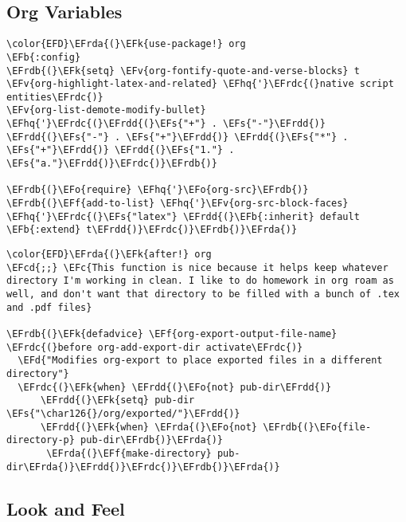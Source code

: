 \documentclass{article}
\newcommand{\EFc}[1]{\textcolor{EFc}{#1}} %
\newcommand{\EFcd}[1]{\textcolor{EFcd}{#1}} %
\newcommand{\EFs}[1]{\textcolor{EFs}{#1}} %
\newcommand{\EFd}[1]{\textcolor{EFd}{#1}} %
\newcommand{\EFk}[1]{\textcolor{EFk}{#1}} %
\newcommand{\EFb}[1]{\textcolor{EFb}{#1}} %
\newcommand{\EFf}[1]{\textcolor{EFf}{#1}} %
\newcommand{\EFv}[1]{\textcolor{EFv}{#1}} %
\newcommand{\EFo}[1]{\textcolor{EFo}{#1}} %
\newcommand{\EFhq}[1]{#1} %
\newcommand{\EFrda}[1]{\textcolor{EFrda}{#1}} %
\newcommand{\EFrdb}[1]{\textcolor{EFrdb}{#1}} %
\newcommand{\EFrdc}[1]{\textcolor{EFrdc}{#1}} %
\newcommand{\EFrdd}[1]{\textcolor{EFrdd}{#1}} %
\begin{document}
\subsection{Org Variables}
\label{sec:org506cd54}
\begin{Code}
\begin{Verbatim}
\color{EFD}\EFrda{(}\EFk{use-package!} org
\EFb{:config}
\EFrdb{(}\EFk{setq} \EFv{org-fontify-quote-and-verse-blocks} t
\EFv{org-highlight-latex-and-related} \EFhq{'}\EFrdc{(}native script entities\EFrdc{)}
\EFv{org-list-demote-modify-bullet} \EFhq{'}\EFrdc{(}\EFrdd{(}\EFs{"+"} . \EFs{"-"}\EFrdd{)} \EFrdd{(}\EFs{"-"} . \EFs{"+"}\EFrdd{)} \EFrdd{(}\EFs{"*"} . \EFs{"+"}\EFrdd{)} \EFrdd{(}\EFs{"1."} . \EFs{"a."}\EFrdd{)}\EFrdc{)}\EFrdb{)}

\EFrdb{(}\EFo{require} \EFhq{'}\EFo{org-src}\EFrdb{)}
\EFrdb{(}\EFf{add-to-list} \EFhq{'}\EFv{org-src-block-faces} \EFhq{'}\EFrdc{(}\EFs{"latex"} \EFrdd{(}\EFb{:inherit} default \EFb{:extend} t\EFrdd{)}\EFrdc{)}\EFrdb{)}\EFrda{)}
\end{Verbatim}
\end{Code}

\begin{Code}
\begin{Verbatim}
\color{EFD}\EFrda{(}\EFk{after!} org
\EFcd{;;} \EFc{This function is nice because it helps keep whatever directory I'm working in clean. I like to do homework in org roam as well, and don't want that directory to be filled with a bunch of .tex and .pdf files}

\EFrdb{(}\EFk{defadvice} \EFf{org-export-output-file-name} \EFrdc{(}before org-add-export-dir activate\EFrdc{)}
  \EFd{"Modifies org-export to place exported files in a different directory"}
  \EFrdc{(}\EFk{when} \EFrdd{(}\EFo{not} pub-dir\EFrdd{)}
      \EFrdd{(}\EFk{setq} pub-dir \EFs{"\char126{}/org/exported/"}\EFrdd{)}
      \EFrdd{(}\EFk{when} \EFrda{(}\EFo{not} \EFrdb{(}\EFo{file-directory-p} pub-dir\EFrdb{)}\EFrda{)}
       \EFrda{(}\EFf{make-directory} pub-dir\EFrda{)}\EFrdd{)}\EFrdc{)}\EFrdb{)}\EFrda{)}
\end{Verbatim}
\end{Code}

\subsection{Look and Feel}
\label{sec:org528fbea}
\end{document}
